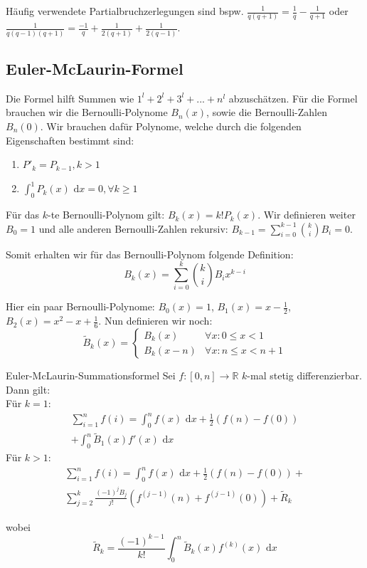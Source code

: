 \documentclass[a4paper,10pt]{article}
\def\R{\mathbb{R}}
\def\dx{\text{ d}x}
\begin{document}
Häufig verwendete Partialbruchzerlegungen sind bspw. $\frac{1}{q(q+1)} = \frac{1}{q} - \frac{1}{q + 1}$ oder $\frac{1}{q(q-1)(q+1)} = \frac{-1}{q} + \frac{1}{2(q+1)} + \frac{1}{2(q-1)}$.

\subsection{Euler-McLaurin-Formel}
Die Formel hilft Summen wie $1^l + 2^l + 3^l + ... + n^l$ abzuschätzen.
Für die Formel brauchen wir die Bernoulli-Polynome $B_n(x)$, sowie die Bernoulli-Zahlen $B_n(0)$.
Wir brauchen dafür Polynome, welche durch die folgenden Eigenschaften bestimmt sind:

\begin{enumerate}
  \item $P'_k = P_{k-1}, k > 1$
  \item $\int_0^1 P_k(x)\dx = 0, \forall k \geq 1$
\end{enumerate}

Für das $k$-te Bernoulli-Polynom gilt: $B_k(x) = k!P_k(x)$. Wir definieren weiter $B_0=1$ und alle anderen Bernoulli-Zahlen rekursiv: $B_{k-1} = \sum_{i=0}^{k-1}{k \choose i}B_i = 0$.

Somit erhalten wir für das Bernoulli-Polynom folgende Definition: $$B_k(x) = \sum_{i=0}^{k}{k \choose i}B_ix^{k-i}$$

Hier ein paar Bernoulli-Polynome: $B_0(x) = 1$, $B_1(x) = x - \frac{1}{2}$, $B_2(x) = x^2 - x + \frac{1}{6}$. Nun definieren wir noch: $$\tilde{B}_k(x) = \begin{cases}
  B_k(x) & \forall x: 0 \leq x < 1 \\
  B_k(x-n) & \forall x: n \leq x < n + 1
\end{cases}$$

\begin{mainbox}{Euler-McLaurin-Summationsformel}
  Sei $f: [0, n] \to \R$ $k$-mal stetig differenzierbar. Dann gilt: \\
  Für $k = 1$:
  \begin{align*}
  \sum_{i = 1}^n f(i) = \int_0^n f(x) \dx + \frac{1}{2}(f(n) - f(0)) \\ + \int_0^n \tilde{B}_1(x)f'(x)\dx
  \end{align*}
  Für $k>1$:
  \begin{align*}
  \sum_{i = 1}^n f(i) = \int_0^n f(x) \dx + \frac{1}{2}(f(n) - f(0))+ \\
  \sum_{j = 2}^k \frac{(-1)^j B_j}{j!}(f^{(j-1)}(n) + f^{(j-1)}(0)) + \tilde{R}_k
  \end{align*}
  
  wobei
  $$ \tilde{R}_k = \frac{(-1)^{k-1}}{k!} \int_0^n \tilde{B}_k(x)f^{(k)}(x)\dx$$
\end{mainbox}
\end{document}
